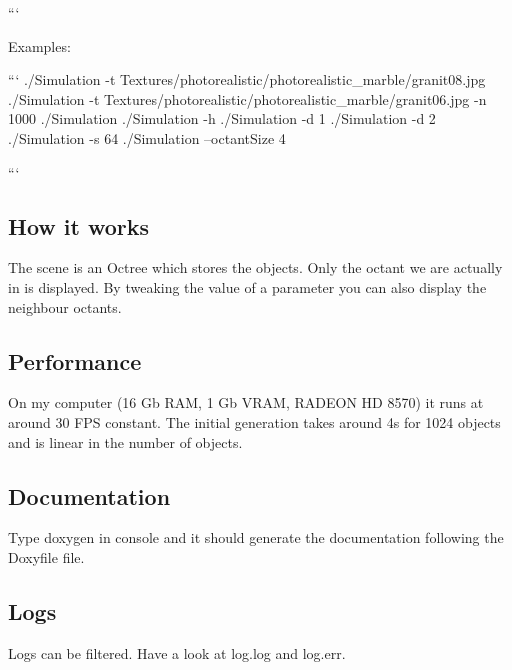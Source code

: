 ```

Examples\+:

``` ./\+Simulation -\/t Textures/photorealistic/photorealistic\+\_\+marble/granit08.\+jpg ./\+Simulation -\/t Textures/photorealistic/photorealistic\+\_\+marble/granit06.\+jpg -\/n 1000 ./\+Simulation ./\+Simulation -\/h ./\+Simulation -\/d 1 ./\+Simulation -\/d 2 ./\+Simulation -\/s 64 ./\+Simulation --octant\+Size 4

```

\subsection*{How it works}

The scene is an Octree which stores the objects. Only the octant we are actually in is displayed. By tweaking the value of a parameter you can also display the neighbour octants.

\subsection*{Performance}

On my computer (16 Gb R\+A\+M, 1 Gb V\+R\+A\+M, R\+A\+D\+E\+O\+N H\+D 8570) it runs at around 30 F\+P\+S constant. The initial generation takes around 4s for 1024 objects and is linear in the number of objects.

\subsection*{Documentation}

Type {\ttfamily doxygen} in console and it should generate the documentation following the {\ttfamily Doxyfile} file.

\subsection*{Logs}

Logs can be filtered. Have a look at {\ttfamily log.\+log} and {\ttfamily log.\+err}. 